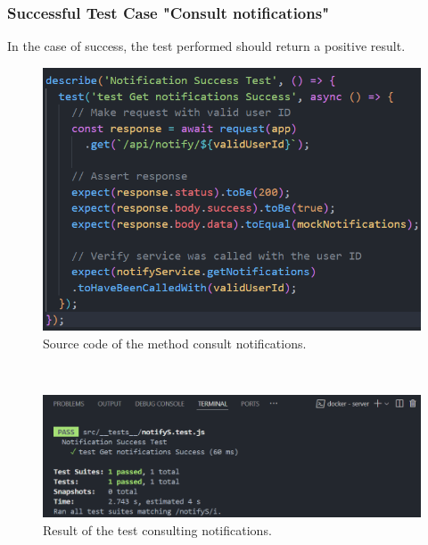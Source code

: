 \subsubsection{Successful Test Case "Consult notifications"} 
In the case of success, the test performed should return a positive result.
\begin{figure}[h!]
    \centering
    \includegraphics[width=1\textwidth]{figures/consult notifS code.png} 
    \caption{Source code of the method consult notifications.}
\end{figure} \
\begin{figure}[h]
    \centering
    \includegraphics[width=1\textwidth]{figures/result consult notifS.png}  
    \caption{Result of the test consulting notifications.}
\end{figure} \
\
